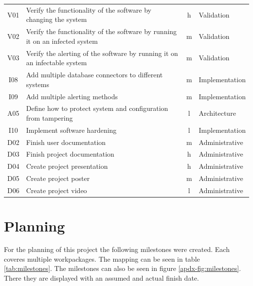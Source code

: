 \documentclass[
	a4paper,					%
	10pt,							%
	twoside,					%
	openright,				%
	notitlepage,			%
	parskip=half,			%
]{scrreprt}					%
\begin{document}
\begin{table}[h!]
\begin{center}
\begin{tabular}{c|l|c|l}
			V01 & Verify the functionality of the software by changing the system & h & Validation \\
			V02 & Verify the functionality of the software by running it on an infected system & m & Validation \\
			V03 & Verify the alerting of the software by running it on an infectable system & m & Validation \\
			I08 & Add multiple database connectors to different systems & m & Implementation \\
			I09 & Add multiple alerting methods & m & Implementation \\
			A05 & Define how to protect system and configuration from tampering & l & Architecture \\
			I10 & Implement software hardening & l & Implementation \\
			D02 & Finish user documentation & m & Administrative \\
			D03 & Finish project documentation & h & Administrative \\ 
			D04 & Create project presentation & h & Administrative \\
			D05 & Create project poster & m & Administrative \\
			D06 & Create project video & l & Administrative \\
    \end{tabular}
  \end{center}
\end{table}

\section{Planning}

For the planning of this project the following milestones were created. Each coveres multiple workpackages. The mapping can be seen in table \ref{tab:milestones}. The milestones can also be seen in figure \ref{apdx-fig:milestones}. There they are displayed with an assumed and actual finish date.
\end{document}
